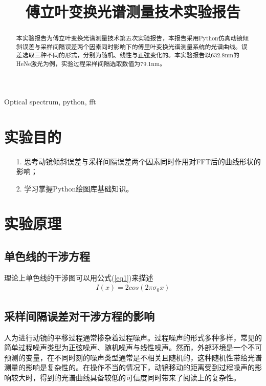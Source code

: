 \documentclass[conference]{IEEEtran}
\begin{document}
\title{傅立叶变换光谱测量技术实验报告}

\author{
}




\maketitle

\begin{abstract}
    本实验报告为傅立叶变换光谱测量技术第五次实验报告，本报告采用Python仿真动镜倾斜误差与采样间隔误差两个因素同时影响下的傅里叶变换光谱测量系统的光谱曲线。误差选取三种不同的形式，分别为随机、线性与正弦变化的。本实验报告以632.8nm的HeNe激光为例，实验过程采样间隔选取数值为79.1nm。
\end{abstract}

\begin{IEEEkeywords}
    Optical spectrum, python, fft
\end{IEEEkeywords}

\section{实验目的}
\begin{itemize}
    \item[1.] 思考动镜倾斜误差与采样间隔误差两个因素同时作用对FFT后的曲线形状的影响；
    \item[2.] 学习掌握Python绘图库基础知识。 
\end{itemize} 

\section{实验原理}
\subsection{单色线的干涉方程}
理论上单色线的干涉图可以用公式(\ref{eq1})来描述
\begin{align}
    I(x) = 2cos(2\pi \sigma_0 x)    \label{eq1}
\end{align}

\subsection{采样间隔误差对干涉方程的影响}
人为进行动镜的平移过程通常掺杂着过程噪声。过程噪声的形式多种多样，常见的简单过程噪声类型为正弦噪声、随机噪声与线性噪声。然而，外部环境是一个不可预测的变量，在不同时刻的噪声类型通常是不相关且随机的，这种随机性带给光谱测量的影响是复杂性的。在操作不当的情况下，动镜移动的距离受到过程噪声的影响较大时，得到的光谱曲线具备较低的可信度同时带来了阅读上的复杂性。
\end{document}
